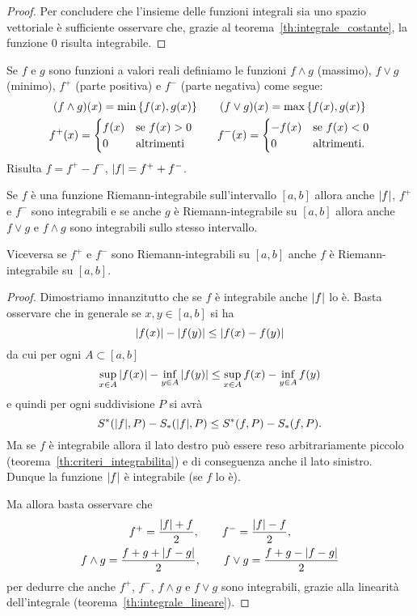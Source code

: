 \begin{proof}
Per concludere che l'insieme delle funzioni integrali sia uno spazio vettoriale
è sufficiente osservare che, grazie al teorema~\ref{th:integrale_costante},
la funzione $0$ risulta integrabile.
\end{proof}

\begin{theorem}
\label{th:reticolo}
Se $f$ e $g$ sono funzioni a valori reali definiamo le
funzioni $f\wedge g$ (massimo), $f \vee g$ (minimo),
$f^+$ (parte positiva) e $f^-$ (parte negativa) come segue:
\begin{gather*}
  (f \wedge g)(x) = \min{\left\{ f(x), g(x) \right\}}  \qquad
  (f \vee g)(x) = \max{\left\{ f(x), g(x) \right\}} \\
  f^+ (x) =
      \begin{cases}
      f(x) & \text{se $f(x)> 0$}\\
      0 & \text{altrimenti}
      \end{cases} \qquad
  f^- (x) =
      \begin{cases}
      -f(x) & \text{se $f(x)< 0$}\\
      0 & \text{altrimenti.}
      \end{cases}
\end{gather*}
Risulta $f= f^+ - f^-$, ${\left|f\right|}=f^+ + f^-$.

Se $f$ è una funzione Riemann-integrabile sull'intervallo $[a,b]$ allora
anche ${\left|f\right|}$, $f^+$ e $f^-$ sono integrabili e se
anche $g$ è Riemann-integrabile su $[a,b]$ allora anche $f\vee g$ e $f\wedge g$
sono integrabili sullo stesso intervallo.

Viceversa se $f^+$ e $f^-$ sono Riemann-integrabili su $[a,b]$ anche $f$
è Riemann-integrabile su $[a,b]$.
\end{theorem}
%
\begin{proof}
Dimostriamo innanzitutto che se $f$ è integrabile anche ${\left|f\right|}$ lo è.
Basta osservare che in generale se $x,y\in [a,b]$ si ha
\[
  {\left|f(x)\right|}-{\left|f(y)\right|} \le {\left|f(x) - f(y)\right|}
\]
da cui per ogni $A\subset [a,b]$
\[
  \sup_{x\in A} {\left|f(x)\right|} - \inf_{y\in A} {\left|f(y)\right|} \le
  \sup_{x\in A} f(x) - \inf_{y\in A}f(y)
\]
e quindi per ogni suddivisione $P$ si avrà
\[
  S^*({\left|f\right|},P) - S_*({\left|f\right|}, P) \le S^*(f,P) - S_*(f,P).
\]
Ma se $f$ è integrabile allora il lato destro può essere reso
arbitrariamente piccolo (teorema~\ref{th:criteri_integrabilita})
e di conseguenza anche il lato sinistro.
Dunque la funzione ${\left|f\right|}$ è integrabile (se $f$ lo è).

Ma allora basta osservare che
\begin{gather*}
  f^+ = \frac{{\left|f\right|} + f}{2}, \qquad
  f^- = \frac{{\left|f\right|} - f}{2}, \\
  f\wedge g = \frac{f + g + {\left|f-g\right|}}{2}, \qquad
  f\vee g = \frac{f+g - {\left|f-g\right|}}{2}
\end{gather*}
per dedurre che anche $f^+$, $f^-$, $f\wedge g$ e $f\vee g$
sono integrabili,
 grazie
alla linearità dell'integrale (teorema~\ref{th:integrale_lineare}).
\end{proof}

